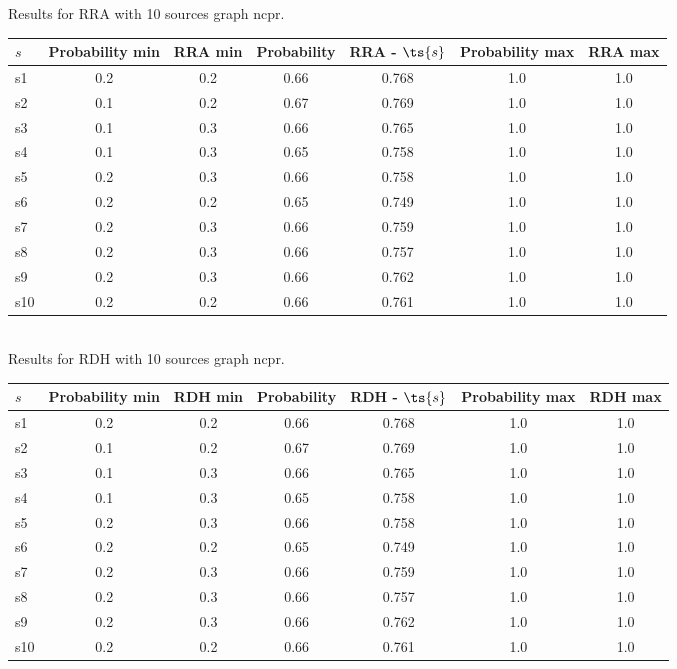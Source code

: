 \documentclass{article}
\begin{document}
\noindent Results for RRA with 10 sources graph ncpr.

\noindent\begin{tabular}{|l|c|c|c|c|c|c|}
\hline
$s$& Probability min & RRA min & Probability & RRA - $\ts{s}$ & Probability max & RRA max\\
\hline
s1 &0.2 & 0.2 & 0.66 & 0.768 & 1.0 & 1.0\\
\hline
s2 &0.1 & 0.2 & 0.67 & 0.769 & 1.0 & 1.0\\
\hline
s3 &0.1 & 0.3 & 0.66 & 0.765 & 1.0 & 1.0\\
\hline
s4 &0.1 & 0.3 & 0.65 & 0.758 & 1.0 & 1.0\\
\hline
s5 &0.2 & 0.3 & 0.66 & 0.758 & 1.0 & 1.0\\
\hline
s6 &0.2 & 0.2 & 0.65 & 0.749 & 1.0 & 1.0\\
\hline
s7 &0.2 & 0.3 & 0.66 & 0.759 & 1.0 & 1.0\\
\hline
s8 &0.2 & 0.3 & 0.66 & 0.757 & 1.0 & 1.0\\
\hline
s9 &0.2 & 0.3 & 0.66 & 0.762 & 1.0 & 1.0\\
\hline
s10 &0.2 & 0.2 & 0.66 & 0.761 & 1.0 & 1.0\\
\hline
\end{tabular}\\

\noindent Results for RDH with 10 sources graph ncpr.

\noindent\begin{tabular}{|l|c|c|c|c|c|c|}
\hline
$s$& Probability min & RDH min & Probability & RDH - $\ts{s}$ & Probability max & RDH max\\
\hline
s1 &0.2 & 0.2 & 0.66 & 0.768 & 1.0 & 1.0\\
\hline
s2 &0.1 & 0.2 & 0.67 & 0.769 & 1.0 & 1.0\\
\hline
s3 &0.1 & 0.3 & 0.66 & 0.765 & 1.0 & 1.0\\
\hline
s4 &0.1 & 0.3 & 0.65 & 0.758 & 1.0 & 1.0\\
\hline
s5 &0.2 & 0.3 & 0.66 & 0.758 & 1.0 & 1.0\\
\hline
s6 &0.2 & 0.2 & 0.65 & 0.749 & 1.0 & 1.0\\
\hline
s7 &0.2 & 0.3 & 0.66 & 0.759 & 1.0 & 1.0\\
\hline
s8 &0.2 & 0.3 & 0.66 & 0.757 & 1.0 & 1.0\\
\hline
s9 &0.2 & 0.3 & 0.66 & 0.762 & 1.0 & 1.0\\
\hline
s10 &0.2 & 0.2 & 0.66 & 0.761 & 1.0 & 1.0\\
\hline
\end{tabular}\\
\end{document}
